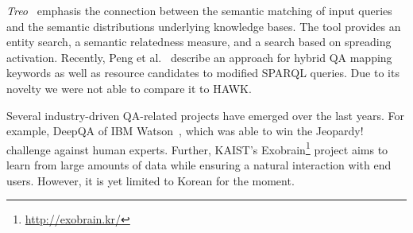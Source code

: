 \emph{Treo}~\cite{treo} emphasis the connection between the semantic matching of input queries and the semantic distributions underlying knowledge bases.
The tool provides an entity search, a semantic relatedness measure, and a search based on spreading activation.
Recently, Peng et al.~\cite{DBLP:journals/corr/PengZZ14} describe an approach for hybrid QA mapping keywords as well as resource candidates to modified SPARQL queries. 
Due to its novelty we were not able to compare it to HAWK.

Several industry-driven QA-related projects have emerged over the last years. 
For example, DeepQA of IBM Watson~\cite{watson}, which was able to win the Jeopardy! challenge against human experts. 
Further, {KAIST's Exobrain\footnote{\url{http://exobrain.kr/}}} project aims to learn from large amounts of data while ensuring a natural interaction with end users. 
However, it is yet limited to Korean for the moment. %

